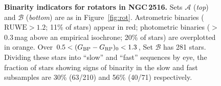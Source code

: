 \documentclass[12pt,twocolumn,tighten]{aastex63}
\newcommand{\cn}{NGC\,2516} %
\newcommand{\bpmrpo}{(G_{\rm BP}-G_{\rm RP})_0}
\begin{document}
\begin{figure}[t!]
	\begin{center}
		\leavevmode

    \vspace{-0.5cm}
	\end{center}
	\vspace{-0.7cm}
  \caption{ {\bf Binarity indicators for rotators in \cn.} Sets
  $\mathcal{A}$ ({\it top}) and $\mathcal{B}$ ({\it bottom}) are as in
  Figure~\ref{fig:rot}.  Astrometric binaries ($\mathrm{RUWE}>1.2$;
  11\% of stars) appear in red; photometric binaries ($>$0.3\,mag
  above an empirical isochrone; 20\% of stars) are overplotted in
  orange.  
  Over $0.5<\bpmrpo<1.3$, Set $\mathcal{B}$ has 281 stars.
  Dividing these stars into ``slow'' and ``fast'' sequences by eye,
  the fraction of stars showing signs of binarity in the slow and fast
  subsamples are 30\% (63/210) and 56\% (40/71) respectively.
  \label{fig:binarity}
	}
\end{figure}
\end{document}
